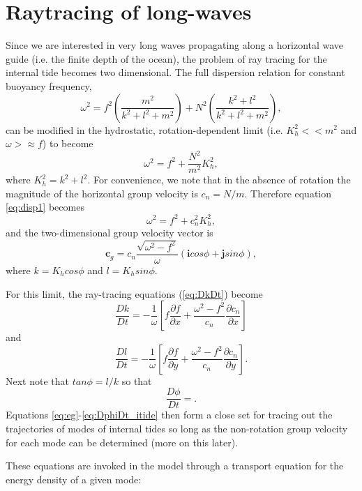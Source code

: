 \documentclass[12pt]{article}
\begin{document}
\section{Raytracing of long-waves}

Since we are interested in very long waves propagating along a horizontal wave guide (i.e. the finite depth of the ocean), the problem of ray tracing for the internal tide becomes two dimensional. The full dispersion relation for constant buoyancy frequency,
\begin{equation}
\omega^2 = f^2\left(\frac{m^2}{k^2+l^2+m^2}\right) + N^2\left(\frac{k^2+l^2}{k^2+l^2+m^2}\right),
\end{equation}
can be modified in the hydrostatic, rotation-dependent limit (i.e. $K_h^2<<m^2$ and $\omega>\approx f$) to become
\begin{equation}
	\label{eq:disp1}
	\omega^2 = f^2 + \frac{N^2}{m^2}K_h^2,
\end{equation}
where $K_h^2=k^2+l^2$. For convenience, we note that in the absence of rotation the magnitude of the horizontal group velocity is $c_n = N/m$. Therefore equation \ref{eq:disp1} becomes
\begin{equation}
	\label{eq:disp}
	\omega^2 = f^2 + c_n^2K_h^2,
\end{equation}
and the two-dimensional group velocity vector is
\begin{equation}
	\label{eq:cg}
	\textbf{c}_g = c_n\frac{\sqrt{\omega^2-f^2}}{\omega}\left(\textbf{i}cos\phi + \textbf{j}sin\phi \right),
\end{equation}
where $k = K_hcos\phi$ and $l = K_hsin\phi$.

For this limit, the ray-tracing equations (\ref{eq:DkDt}) become
\begin{equation}
	\label{eq:DkDt_itide}
	\frac{Dk}{Dt} = -\frac{1}{\omega}\left[f\frac{\partial f}{\partial x} + \frac{\omega^2-f^2}{c_n}\frac{\partial c_n}{\partial x} \right]
\end{equation}
and
\begin{equation}
	\label{eq:DlDt_itide}
	\frac{Dl}{Dt} = -\frac{1}{\omega}\left[f\frac{\partial f}{\partial y} + \frac{\omega^2-f^2}{c_n}\frac{\partial c_n}{\partial y} \right].
\end{equation}
Next note that $tan\phi = l/k$ so that 
\begin{equation}
	\label{eq:DphiDt_itide}
	\frac{D\phi}{Dt} = .
\end{equation}
Equations \ref{eq:eg}-\ref{eq:DphiDt_itide} then form a close set for tracing out the trajectories of modes of internal tides so long as the non-rotation group velocity for each mode can be determined (more on this later).

These equations are invoked in the model through a transport equation for the energy density of a given mode:
\end{document}
